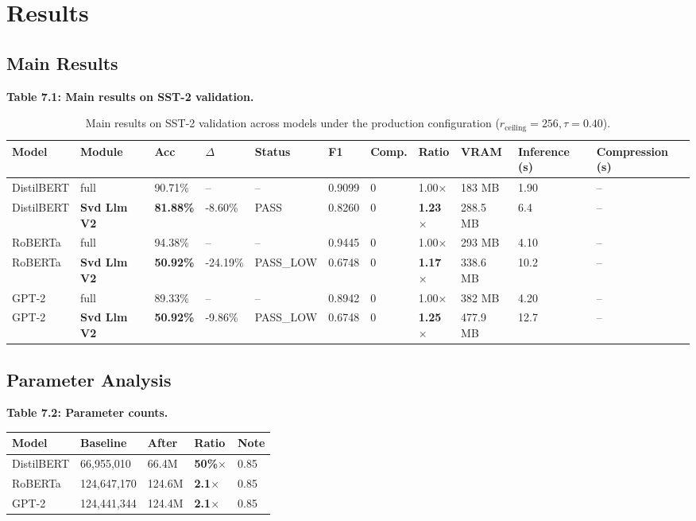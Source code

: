 
\section{Results}

\subsection{Main Results}

\textbf{Table 7.1: Main results on SST-2 validation.}

\begin{table}[t]
\centering
\small
\begin{tabular}{lllllllllll}
\toprule
\textbf{Model} & \textbf{Module} & \textbf{Acc} & \textbf{$\Delta$} & \textbf{Status} & \textbf{F1} & \textbf{Comp.} & \textbf{Ratio} & \textbf{VRAM} & \textbf{Inference (s)} & \textbf{Compression (s)} \\
\midrule
DistilBERT & full & 90.71\% & -- & -- & 0.9099 & 0 & 1.00$\times$ & 183 MB & 1.90 & -- \\
DistilBERT & \textbf{Svd Llm V2} & \textbf{81.88\%} & -8.60\% & PASS & 0.8260 & 0 & \textbf{1.23$\times$} & 288.5 MB & 6.4 & -- \\
RoBERTa & full & 94.38\% & -- & -- & 0.9445 & 0 & 1.00$\times$ & 293 MB & 4.10 & -- \\
RoBERTa & \textbf{Svd Llm V2} & \textbf{50.92\%} & -24.19\% & PASS\_LOW & 0.6748 & 0 & \textbf{1.17$\times$} & 338.6 MB & 10.2 & -- \\
GPT-2 & full & 89.33\% & -- & -- & 0.8942 & 0 & 1.00$\times$ & 382 MB & 4.20 & -- \\
GPT-2 & \textbf{Svd Llm V2} & \textbf{50.92\%} & -9.86\% & PASS\_LOW & 0.6748 & 0 & \textbf{1.25$\times$} & 477.9 MB & 12.7 & -- \\
\bottomrule
\end{tabular}
\caption{Main results on SST-2 validation across models under the production configuration ($r_{\mathrm{ceiling}}=256, \tau=0.40$).}
\label{tab:main_sst2}
\end{table}

\subsection{Parameter Analysis}

\textbf{Table 7.2: Parameter counts.}

\begin{table}[H]
\centering
\small
\begin{tabular}{lllll}
\toprule
\textbf{Model} & \textbf{Baseline} & \textbf{After} & \textbf{Ratio} & \textbf{Note} \\
\midrule
DistilBERT & 66,955,010 & 66.4M & \textbf{50\%$\times$} & 0.85 \\
RoBERTa & 124,647,170 & 124.6M & \textbf{2.1$\times$} & 0.85 \\
GPT-2 & 124,441,344 & 124.4M & \textbf{2.1$\times$} & 0.85 \\
\bottomrule
\end{tabular}
\end{table}

